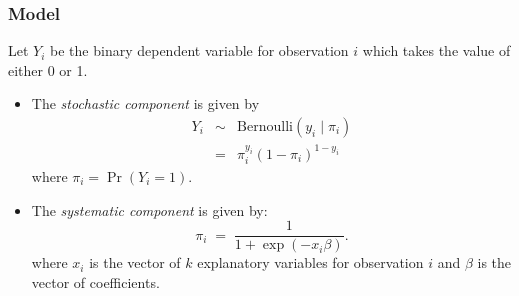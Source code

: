 \subsubsection{Model}
Let $Y_i$ be the binary dependent variable for observation $i$ which
takes the value of either 0 or 1.
\begin{itemize}

\item The \emph{stochastic component} is given by  
\begin{eqnarray*}
Y_i &\sim& \textrm{Bernoulli}(y_i \mid \pi_i) \\
    &=& \pi_i^{y_i} (1-\pi_i)^{1-y_i}
\end{eqnarray*}
where $\pi_i=\Pr(Y_i=1)$.

\item The \emph{systematic component} is given by: 
\begin{equation*}
\pi_i \; = \; \frac{1}{1 + \exp(-x_i \beta)}.
\end{equation*}
where $x_i$ is the vector of $k$ explanatory variables for observation $i$
and $\beta$ is the vector of coefficients.
\end{itemize}

